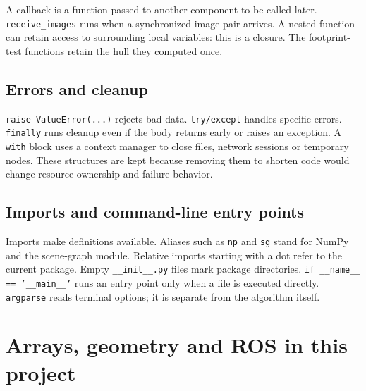 \documentclass[11pt,a4paper]{book}
\begin{document}
A callback is a function passed to another component to be called later.
\texttt{receive\_images} runs when a synchronized image pair arrives.
A nested function can retain access to surrounding local variables: this is a
closure. The footprint-test functions retain the hull they computed once.

\section{Errors and cleanup}
\texttt{raise ValueError(...)} rejects bad data. \texttt{try/except} handles
specific errors. \texttt{finally} runs cleanup even if the body returns early or
raises an exception. A \texttt{with} block uses a context manager to close files,
network sessions or temporary nodes. These structures are kept because removing
them to shorten code would change resource ownership and failure behavior.

\section{Imports and command-line entry points}
Imports make definitions available. Aliases such as \texttt{np} and
\texttt{sg} stand for NumPy and the scene-graph module. Relative imports starting
with a dot refer to the current package. Empty \texttt{\_\_init\_\_.py} files mark
package directories. \texttt{if \_\_name\_\_ == '\_\_main\_\_'} runs an entry
point only when a file is executed directly. \texttt{argparse} reads terminal
options; it is separate from the algorithm itself.

\chapter{Arrays, geometry and ROS in this project}
\end{document}

